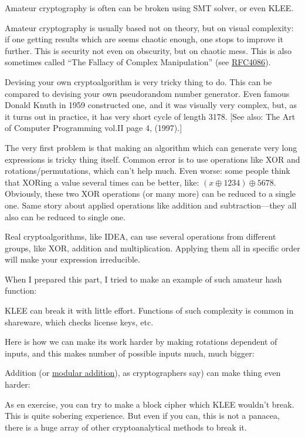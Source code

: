 Amateur cryptography is often can be broken using SMT solver, or even KLEE.

Amateur cryptography is usually based not on theory, but on visual complexity: if one getting results which are seems chaotic enough, one stops to improve it further.
This is security not even on obscurity, but on chaotic mess.
This is also sometimes called ``The Fallacy of Complex Manipulation'' (see \href{https://tools.ietf.org/html/rfc4086}{RFC4086}).

Devising your own cryptoalgorithm is very tricky thing to do.
This can be compared to devising your own pseudorandom number generator.
Even famous Donald Knuth in 1959 constructed one, and it was visually very complex, but, as it turns out in practice, it has very short cycle of length 3178.
[See also: The Art of Computer Programming vol.II page 4, (1997).]

The very first problem is that making an algorithm which can generate very long expressions is tricky thing itself.
Common error is to use operations like XOR and rotations/permutations, which can't help much.
Even worse: some people think that XORing a value several times can be better, like: $(x \oplus 1234) \oplus 5678$.
Obviously, these two XOR operations (or many more) can be reduced to a single one.
Same story about applied operations like addition and subtraction---they all also can be reduced to single one.

Real cryptoalgorithms, like IDEA, can use several operations from different groups, like XOR, addition and multiplication.
Applying them all in specific order will make your expression irreducible.

When I prepared this part, I tried to make an example of such amateur hash function:



KLEE can break it with little effort.
Functions of such complexity is common in shareware, which checks license keys, etc.

Here is how we can make its work harder by making rotations dependent of inputs, and this makes number of possible inputs much, much bigger:



Addition (or \href{https://yurichev.com/blog/modulo/}{modular addition}), as cryptographers say) can make thing even harder:



As en exercise, you can try to make a block cipher which KLEE wouldn't break.
This is quite sobering experience.
But even if you can, this is not a panacea, there is a huge array of other cryptoanalytical methods to break it.

